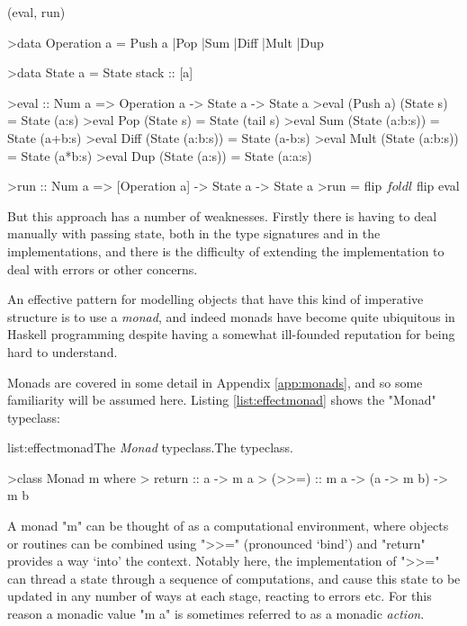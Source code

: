 \functions(eval, run)
\begin{haskell}

>data Operation a = Push a |Pop |Sum |Diff |Mult |Dup

>data State a = State {stack :: [a]}

>eval :: Num a => Operation a -> State a -> State a
>eval (Push a) (State s) = State (a:s)
>eval Pop  (State s) = State (tail s)
>eval Sum  (State (a:b:s)) = State (a+b:s)
>eval Diff (State (a:b:s)) = State (a-b:s)
>eval Mult (State (a:b:s)) = State (a*b:s)
>eval Dup  (State (a:s)) = State (a:a:s)

>run :: Num a => [Operation a] -> State a -> State a
>run = flip $ foldl $ flip eval

\end{haskell}
\noindent But this approach has a number of weaknesses. Firstly there is having to deal manually with passing state, both in the type signatures and in the implementations, and there is the difficulty of extending the implementation to deal with errors or other concerns.

An effective pattern for modelling objects that have this kind of imperative structure is to use a \emph{monad}, and indeed monads have become quite ubiquitous in Haskell programming despite having a somewhat ill-founded reputation for being hard to understand.

Monads are covered in some detail in Appendix \ref{app:monads}, and so some familiarity will be assumed here. Listing \ref{list:effectmonad} shows the "Monad" typeclass:

\vspace{-0.5em}
\begin{listing}{list:effectmonad}{The \emph{Monad} typeclass.}{The  typeclass.}{}
\end{listing}\vspace{-1.5em}

\begin{haskell}

>class Monad m where
>  return :: a -> m a
>  (>>=) :: m a -> (a -> m b) -> m b

\end{haskell}
\noindent A monad "m" can be thought of as a computational environment, where objects or routines can be combined using ">>=" (pronounced `bind') and "return" provides a way `into' the context. Notably here, the implementation of ">>=" can thread a state through a sequence of computations, and cause this state to be updated in any number of ways at each stage, reacting to errors etc. For this reason a monadic value "m a" is sometimes referred to as a monadic \emph{action}.

